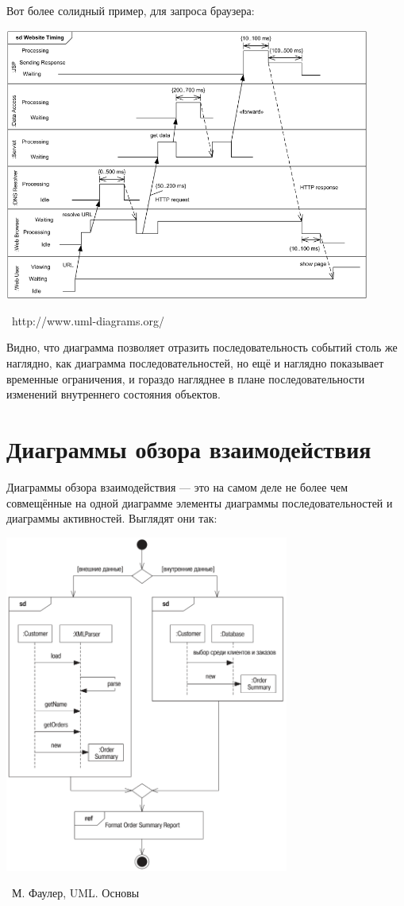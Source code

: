 \documentclass[a5paper]{article}
\newcommand{\attribution}[1] {
    \vspace{-5mm}\begin{flushright}\begin{scriptsize}%
    {\textcopyright\, #1}\end{scriptsize}\end{flushright}
}
\begin{document}
Вот более солидный пример, для запроса браузера:

\begin{center}
    \includegraphics[width=0.9\textwidth]{timingDiagramExample.png}
    \attribution{http://www.uml-diagrams.org/}
\end{center}

Видно, что диаграмма позволяет отразить последовательность событий столь же наглядно, как диаграмма последовательностей, но ещё и наглядно показывает временные ограничения, и гораздо нагляднее в плане последовательности изменений внутреннего состояния объектов.

\section{Диаграммы обзора взаимодействия}

Диаграммы обзора взаимодействия --- это на самом деле не более чем совмещённые на одной диаграмме элементы диаграммы последовательностей и диаграммы активностей. Выглядят они так:

\begin{center}
    \includegraphics[width=0.7\textwidth]{interactionOverviewDiagrams.png}
    \attribution{М. Фаулер, UML. Основы}
\end{center}
\end{document}
